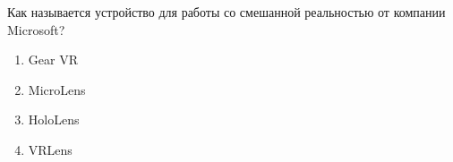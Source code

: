 
Как называется устройство для работы со смешанной реальностью от компании Microsoft?

\begin{enumerate}
    \item Gear VR
    \item MicroLens
    \item HoloLens
    \item VRLens
\end{enumerate}